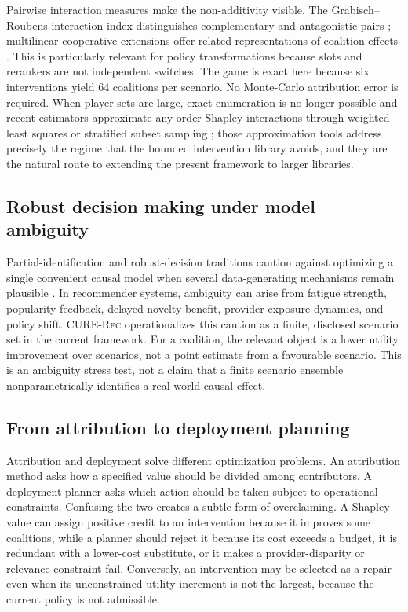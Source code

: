 \documentclass[review]{elsarticle}
\theoremstyle{plain}
\theoremstyle{definition}
\theoremstyle{remark}
\newcommand{\CURE}{\textsc{CURE-Rec}}
\begin{document}
Pairwise interaction measures make the non-additivity visible. The Grabisch--Roubens interaction index distinguishes complementary and antagonistic pairs \cite{grabisch1999interaction}; multilinear cooperative extensions offer related representations of coalition effects \cite{owen1972multilinear}. This is particularly relevant for policy transformations because slots and rerankers are not independent switches. The game is exact here because six interventions yield 64 coalitions per scenario. No Monte-Carlo attribution error is required. When player sets are large, exact enumeration is no longer possible and recent estimators approximate any-order Shapley interactions through weighted least squares or stratified subset sampling \cite{fumagalli2024kernelshapiq,kolpaczki2024svarmiq}; those approximation tools address precisely the regime that the bounded intervention library avoids, and they are the natural route to extending the present framework to larger libraries.

\subsection{Robust decision making under model ambiguity}

Partial-identification and robust-decision traditions caution against optimizing a single convenient causal model when several data-generating mechanisms remain plausible \cite{manski2003partial,rosenbaum2002observational,athey2017state}. In recommender systems, ambiguity can arise from fatigue strength, popularity feedback, delayed novelty benefit, provider exposure dynamics, and policy shift. \CURE{} operationalizes this caution as a finite, disclosed scenario set in the current framework. For a coalition, the relevant object is a lower utility improvement over scenarios, not a point estimate from a favourable scenario. This is an ambiguity stress test, not a claim that a finite scenario ensemble nonparametrically identifies a real-world causal effect.

\subsection{From attribution to deployment planning}

Attribution and deployment solve different optimization problems. An attribution method asks how a specified value should be divided among contributors. A deployment planner asks which action should be taken subject to operational constraints. Confusing the two creates a subtle form of overclaiming. A Shapley value can assign positive credit to an intervention because it improves some coalitions, while a planner should reject it because its cost exceeds a budget, it is redundant with a lower-cost substitute, or it makes a provider-disparity or relevance constraint fail. Conversely, an intervention may be selected as a repair even when its unconstrained utility increment is not the largest, because the current policy is not admissible.
\end{document}
